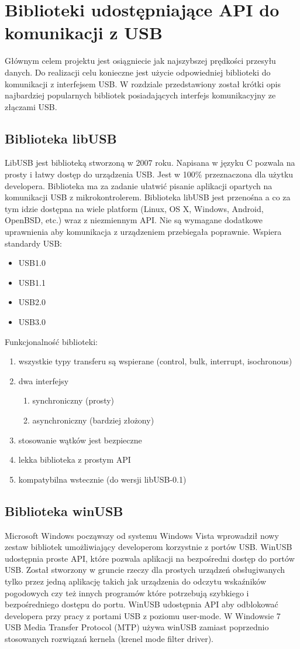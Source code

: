 \documentclass{BscUS}
\begin{document}
\chapter{Biblioteki udostępniające API do komunikacji z USB}
\label{librariesChapter}
Głównym celem projektu jest osiągniecie jak najszybszej prędkości przesyłu danych. Do realizacji celu konieczne jest użycie odpowiedniej biblioteki do komunikacji z interfejsem USB. W rozdziale przedstawiony został krótki opis najbardziej popularnych bibliotek posiadających interfejs komunikacyjny ze złączami USB.
\section{Biblioteka libUSB \cite{libusbDesc}}
LibUSB jest biblioteką stworzoną w 2007 roku. Napisana w języku C  pozwala na prosty i łatwy dostęp do urządzenia USB. Jest w 100\% przeznaczona dla użytku developera. Biblioteka ma za zadanie ułatwić pisanie aplikacji opartych na komunikacji USB z mikrokontrolerem.
Biblioteka libUSB jest przenośna a co za tym idzie dostępna na wiele platform (Linux, OS X, Windows, Android, OpenBSD, etc.) wraz z niezmiennym API.
Nie są wymagane dodatkowe uprawnienia aby komunikacja z urządzeniem przebiegała poprawnie.
Wspiera standardy USB: 
\begin{itemize}
\item USB1.0 
\item USB1.1 
\item USB2.0 
\item USB3.0
\end{itemize}
Funkcjonalność biblioteki:
\begin{enumerate}
\item wszystkie typy transferu są wspierane (control, bulk, interrupt, isochronous)
\item dwa interfejsy
\begin{enumerate}
\item synchroniczny (prosty)
\item asynchroniczny (bardziej złożony)
\end{enumerate}
\item stosowanie wątków jest bezpieczne
\item lekka biblioteka z prostym API
\item kompatybilna wstecznie (do wersji libUSB-0.1)
\end{enumerate}
\section{Biblioteka winUSB}
Microsoft Windows począwszy od systemu Windows Vista wprowadził nowy zestaw bibliotek umożliwiający developerom korzystnie z portów USB. WinUSB udostępnia proste API, które pozwala aplikacji na bezpośredni dostęp do portów USB. Został stworzony w gruncie rzeczy dla prostych urządzeń obsługiwanych tylko przez jedną aplikację takich jak urządzenia do odczytu wskaźników pogodowych czy też innych programów które potrzebują szybkiego i bezpośredniego dostępu do portu. WinUSB udostępnia API aby odblokować developera przy pracy z portami USB z poziomu user-mode. W Windowsie 7 USB Media Transfer Protocol (MTP) używa winUSB zamiast poprzednio stosowanych rozwiązań kernela (krenel mode filter driver).
\end{document}

